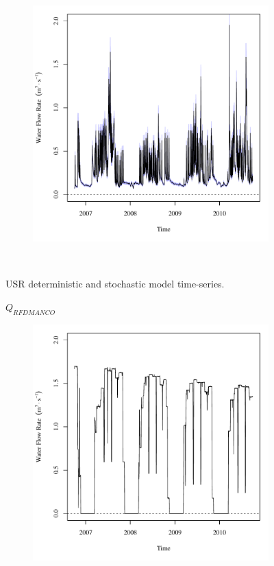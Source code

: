 \begin{linenumbers}
\begin{landscape}
\begin{figure}
\begin{subfigure}{0.7\textwidth}
			\includegraphics[width=\textwidth]{"Figures/Results_USR/Stochastic/Q HRC"}
		\end{subfigure}\\
		\caption{USR deterministic and stochastic model time-series.}
	\end{figure}
\end{landscape}
\subfiguremid
\begin{landscape}
	\begin{figure}
		\centering
		$ Q_{RFDMANCO} $
		\begin{subfigure}{0.7\textwidth}
			\centering
			\includegraphics[width=\textwidth]{"Figures/Results_USR/Deterministic/Q RFD"}

\end{subfigure}
\end{figure}
\end{landscape}
\end{linenumbers}

